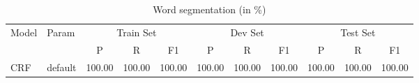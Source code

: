 \begin{table}[htbp!]
    \centering
    \begin{tabular}{llccccccccc}
    \toprule
        \multicolumn{1}{c}{\multirow{2}{*}{Model}} & \multirow{2}{*}{Param}      & \multicolumn{3}{c}{Train Set}     & \multicolumn{3}{c}{Dev Set}           & \multicolumn{3}{c}{Test Set}          \\
        \multicolumn{1}{c}{}                       &                             & P             & R        & F1     & P             & R        & F1         & P             & R        & F1         \\
        \midrule
        CRF      & default                                                       & 100.00        & 100.00   & 100.00  & 100.00       & 100.00   & 100.00     & 100.00        & 100.00   & 100.00     \\
    \bottomrule
    \end{tabular}
\caption{Word segmentation (in \%)}
\label{tab:cws_result}
\end{table}